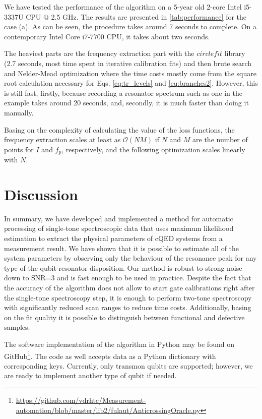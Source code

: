 \documentclass[%
 aip,
 draft,
 amsmath,amssymb,
 reprint,%
]{revtex4-1}
\begin{document}
We have tested the performance of the algorithm on a 5-year old 2-core Intel i5-3337U CPU @ 2.5 GHz. The results are presented in \autoref{tab:performance} for the case (a).  As can be seen, the procedure takes around 7 seconds to complete. On a contemporary Intel Core i7-7700 CPU, it takes about two seconds. 

The heaviest parts are the frequency extraction part with the $circlefit$ library (2.7 seconds, most time spent in iterative calibration fits) and then brute search and Nelder-Mead optimization where the time costs mostly come from the square root calculation necessary for Eqs. \eqref{eq:tr_levels} and \eqref{eq:branches2}. However, this is still fast, firstly, because recording a resonator spectrum such as one in the example takes around 20 seconds, and, secondly, it is much faster than doing it manually. 

Basing on the complexity of calculating the value of the loss functions, the frequency extraction scales at least as $\mathcal{O}(NM)$ if $N$ and $M$ are the number of points for $I$ and $f_p$, respectively, and the following optimization scales linearly with $N$. 


\section{Discussion}


In summary, we have developed and implemented a method for automatic processing of single-tone spectroscopic data that uses maximum likelihood estimation to extract the physical parameters of cQED systems from a measurement result. We have shown that it is possible to estimate all of the system parameters by observing only the behaviour of the resonance peak for any type of the qubit-resonator disposition. Our method is robust to strong noise down to SNR=3 and is fast enough to be used in practice. Despite the fact that the accuracy of the algorithm does not allow to start gate calibrations right after the single-tone spectroscopy step, it is enough to perform two-tone spectroscopy with significantly reduced scan ranges to reduce time costs. Additionally, basing on the fit quality it is possible to distinguish between functional and defective samples.

The software implementation of the algorithm in Python may be found on GitHub\footnote{\url{https://github.com/vdrhtc/Measurement-automation/blob/master/lib2/fulaut/AnticrossingOracle.py}}. The code as well accepts data as a Python dictionary with corresponding keys. Currently, only transmon qubits are supported; however, we are ready to implement another type of qubit if needed.
\end{document}
